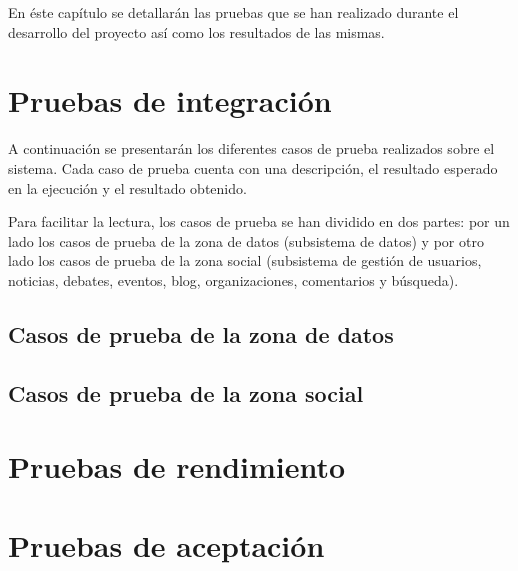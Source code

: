 En éste capítulo se detallarán las pruebas que se han realizado durante el desarrollo del proyecto así como los resultados de las mismas.


\section{Pruebas de integración}
\label{pruebas:integracion}
	A continuación se presentarán los diferentes casos de prueba realizados sobre el sistema.  Cada caso de prueba cuenta con una descripción, el resultado esperado en la ejecución y el resultado obtenido.
	
	Para facilitar la lectura, los casos de prueba se han dividido en dos partes: por un lado los casos de prueba de la zona de datos (subsistema de datos) y por otro lado los casos de prueba de la zona social (subsistema de gestión de usuarios, noticias, debates, eventos, blog, organizaciones, comentarios y búsqueda).
	
	
	\subsection{Casos de prueba de la zona de datos}
	\label{pruebas:integracion:zona_datos}
	
	
	
	\subsection{Casos de prueba de la zona social}
	\label{pruebas:integracion:zona_social}
	


\section{Pruebas de rendimiento}
\label{pruebas:rendimiento}


\section{Pruebas de aceptación}
\label{pruebas:aceptacion}